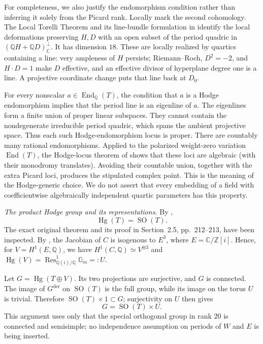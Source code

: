 For completeness, we also justify the endomorphism condition rather
than inferring it solely from the Picard rank. Locally mark the second
cohomology. The Local Torelli Theorem and its line-bundle formulation
in \citet[Proposition~6.2.8 and Section~6.2.4, pp.~107--108 of the
opened author version]{frHuybrechtsK3Book} identify the local deformations
preserving $H,D$ with an open subset of the period quadric in
$(\mathbb QH+\mathbb QD)^\perp_{\mathbb C}$. It has dimension $18$.
These are locally realized by quartics containing a line: very ampleness
of $H$ persists; Riemann--Roch, $D^2=-2$, and $H\cdot D=1$ make $D$
effective, and an effective divisor of hyperplane degree one is a line.
A projective coordinate change puts that line back at $D_0$.

For every nonscalar $a\in\operatorname{End}_{\mathbb Q}(T)$, the
condition that $a$ is a Hodge endomorphism implies that the period line
is an eigenline of $a$. The eigenlines form a finite union of proper
linear subspaces. They cannot contain the nondegenerate irreducible
period quadric, which spans the ambient projective space. Thus each
such Hodge-endomorphism locus is proper. There are countably many
rational endomorphisms. Applied to the polarized weight-zero variation
$\operatorname{End}(T)$, the Hodge-locus theorem of
\citet[Theorem~1.1 and Corollary~1.3, p.~2]{frCDK1994}
shows that these loci are algebraic (with their monodromy translates).
Avoiding their countable union, together with the extra Picard loci,
produces the stipulated complex point. This is the meaning of the
Hodge-generic choice. We do not assert that every embedding of a field
with coefficientwise algebraically independent quartic parameters has
this property.

\emph{The product Hodge group and its representations.}
By \citet[Theorem~2.2.1 and Example~2.2.3, p.~211]{frZarhin1983},
\[
                    \operatorname{Hg}(T)=\operatorname{SO}(T).
\]
The exact original theorem and its proof in Section~2.5, pp.~212--213,
have been inspected. By \citet[Lemma~2, p.~106, and Example~3,
pp.~106--107]{frBeauville2014}, the Jacobian of $C$ is isogenous to
$E^3$, where $E=\mathbb C/\mathbb Z[i]$. Hence, for $V=H^1(E,\mathbb Q)$,
we have $H^1(C,\mathbb Q)\simeq V^{\oplus3}$ and
$\operatorname{Hg}(V)=\operatorname{Res}^{1}_{\mathbb Q(i)/\mathbb Q}
\mathbb G_m=:U$.

Let $G=\operatorname{Hg}(T\oplus V)$. Its two projections are surjective,
and $G$ is connected. The image of $G^{\mathrm{der}}$ on
$\operatorname{SO}(T)$ is the full group, while its image on the torus
$U$ is trivial. Therefore $\operatorname{SO}(T)\times1\subset G$;
surjectivity on $U$ then gives
\[
                   G=\operatorname{SO}(T)\times U.
\]
This argument uses only that the special orthogonal group in rank $20$
is connected and semisimple; no independence assumption on periods
of $W$ and $E$ is being inserted.

